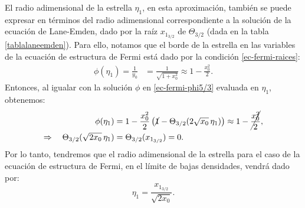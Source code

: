 El radio adimensional de la estrella $\eta_1$, en esta aproximación, también se puede expresar en términos del radio adimensional correspondiente a la solución de la ecuación de Lane-Emden, dado por la raíz $x_{1_{3/2}}$ de $\Theta_{3/2}$ (dada en la tabla \ref{tablalaneemden}). Para ello, notamos que el borde de la estrella en las variables de la ecuación de estructura de Fermi está dado por la condición \eqref{ec-fermi-raices}:
\begin{align}
 \phi(\eta_1)=\frac{1}{y_0}&=\frac{1}{\sqrt{1+x_0^2}}\approx1-\frac{x_0^2}{2}.
\end{align}
Entonces, al igualar con la solución $\phi$ en \eqref{ec-fermi-phi5/3} evaluada en $\eta_1$, obtenemos:
\begin{align}
 \phi(\eta_1)&=1-\frac{x_0^2}{2}\left(\cancel{1}-\Theta_{3/2}(2\sqrt{x_0} \,\eta_1)\right)\approx1-\cancel{\frac{x_0^2}{2}},\\
\Rightarrow\quad \Theta_{3/2}(\sqrt{2x_0} \,\eta_1)&=\Theta_{3/2}(x_{1_{3/2}})=0.
\end{align}
Por lo tanto, tendremos que el radio adimensional de la estrella para el caso de la ecuación de estructura de Fermi, en el límite de bajas densidades, vendrá dado por:
\begin{equation}\label{ec-fermi-eta1}
 \eta_1=\frac{x_{1_{3/2}}}{\sqrt{2x_0}}.
\end{equation}

